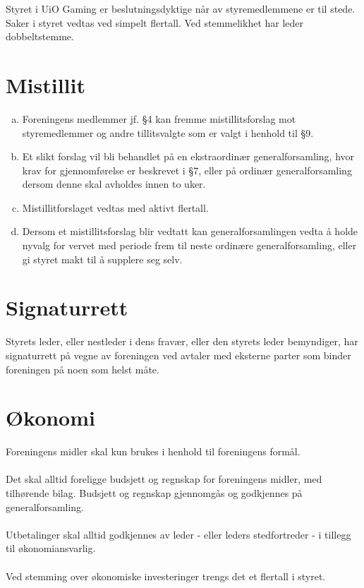 \documentclass[12pt,a4paper,norsk]{article}
\begin{document}
Styret i UiO Gaming er beslutningsdyktige når  av styremedlemmene er til stede. Saker i styret vedtas ved simpelt flertall. Ved stemmelikhet har leder dobbeltstemme.



\section{Mistillit}

\begin{enumerate}[a)]
    \item Foreningens medlemmer jf. §4 kan fremme mistillitsforslag mot styremedlemmer og andre tillitsvalgte som er valgt i henhold til §9.
    \item Et slikt forslag vil bli behandlet på en ekstraordinær generalforsamling, hvor krav for gjennomførelse er beskrevet i §7, eller på ordinær generalforsamling dersom denne skal avholdes innen to uker.
    \item Mistillitforslaget vedtas med  aktivt flertall.
    \item Dersom et mistillitsforslag blir vedtatt kan generalforsamlingen vedta å holde nyvalg for vervet med periode frem til neste ordinære generalforsamling, eller gi styret makt til å supplere seg selv.
\end{enumerate}



\section{Signaturrett}

Styrets leder, eller nestleder i dens fravær, eller den styrets leder bemyndiger, har signaturrett
på vegne av foreningen ved avtaler med eksterne parter som binder foreningen på noen som
helst måte.



\section{Økonomi}

Foreningens midler skal kun brukes i henhold til foreningens formål.
\\
\\
Det skal alltid foreligge budsjett og regnskap for foreningens midler, med tilhørende bilag.
Budsjett og regnskap gjennomgås og godkjennes på generalforsamling.
\\
\\
Utbetalinger skal alltid godkjennes av leder - eller leders stedfortreder - i tillegg til
økonomiansvarlig.
\\
\\
Ved stemming over økonomiske investeringer trengs det et  flertall i styret.
\end{document}
